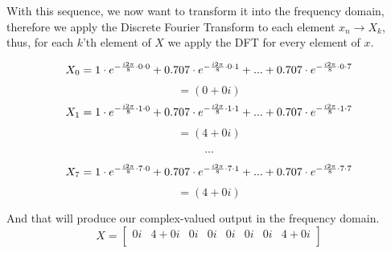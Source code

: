 \documentclass[
  oneside,
  11pt, a4paper,
  footinclude=true,
  headinclude=true,
  cleardoublepage=empty
]{scrbook}
\begin{document}
With this sequence, we now want to transform it into the frequency domain, therefore we apply the Discrete Fourier Transform to each element \( x_{n} \rightarrow X_{k} \), thus, for each \(k\)'th element of \(X\) we apply the DFT for every element of \(x\).

\begin{equation*}
    X_{0} = 1 \cdot e^{- \frac{i 2 \pi}{8} \cdot 0 \cdot 0} \\
        + 0.707 \cdot e^{- \frac{i 2 \pi}{8} \cdot 0 \cdot 1}  \\
        + ...  \\
        + 0.707 \cdot e^{- \frac{i 2 \pi}{8} \cdot 0 \cdot 7} \\
\end{equation*}
\begin{equation*}
    = (0 + 0i)
\end{equation*}
\begin{equation*}
    X_{1} = 1 \cdot e^{- \frac{i 2 \pi}{8} \cdot 1 \cdot 0} \\
        + 0.707 \cdot e^{- \frac{i 2 \pi}{8} \cdot 1 \cdot 1}  \\
        + ...  \\
        + 0.707 \cdot e^{- \frac{i 2 \pi}{8} \cdot 1 \cdot 7} \\
\end{equation*}
\begin{equation*}
    = (4 + 0i)
\end{equation*}

\begin{equation*}
    . . .
\end{equation*}

\begin{equation*}
    X_{7} = 1 \cdot e^{- \frac{i 2 \pi}{8} \cdot 7 \cdot 0} \\
        + 0.707 \cdot e^{- \frac{i 2 \pi}{8} \cdot 7 \cdot 1}  \\
        + ...  \\
        + 0.707 \cdot e^{- \frac{i 2 \pi}{8} \cdot 7 \cdot 7} \\
\end{equation*}
\begin{equation*}
    = (4 + 0i)
\end{equation*}


And that will produce our complex-valued output in the frequency domain.
\begin{equation*}
    X = 
    \begin{bmatrix}
        0i & 4+0i & 0i & 0i & 0i & 0i & 0i & 4+0i\\
    \end{bmatrix}
\end{equation*}
\end{document}
